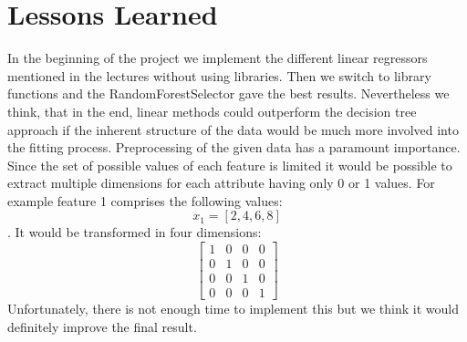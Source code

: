 \documentclass[a4paper, 10pt]{article}
\begin{document}
\section{Lessons Learned}
In the beginning of the project we implement the different linear regressors mentioned in the lectures without using libraries. Then we switch to library functions and the RandomForestSelector gave the best results. Nevertheless we think, that in the end, linear methods could outperform the decision tree approach if the inherent structure of the data would be much more involved into the fitting process. Preprocessing of the given data has a paramount importance. Since the set of possible values of each feature is limited it would be possible to extract multiple dimensions for each attribute having only 0 or 1 values. For example feature 1 comprises the following values:\[x_1=[2, 4, 6, 8] \]	.
It would be transformed in four dimensions:
	\[ \begin{bmatrix}
	 	1 & 0 & 0 & 0 \\
	 	0 & 1 & 0 & 0 \\
	 	0 & 0 & 1 & 0 \\
	 	0 & 0 & 0 & 1
	 \end{bmatrix}	\]
Unfortunately, there is not enough time to implement this but we think it would definitely improve the final result.
\end{document}
